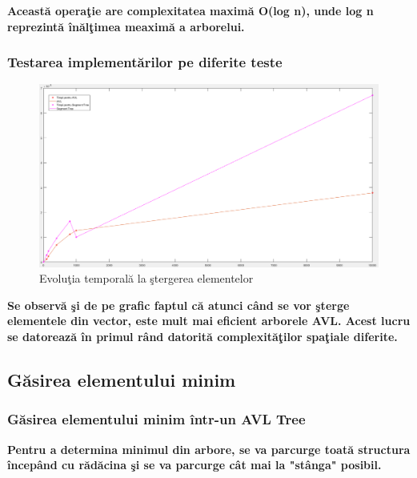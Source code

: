 \documentclass[12pt]{article}
\begin{document}
\textbf{\hspace{7mm} Aceast\u{a} opera\c{t}ie are complexitatea maxim\u{a} O(log n), unde log n reprezint\u{a} \^{i}n\u{a}l\c{t}imea meaxim\u{a} a arborelui.}
\subsubsection{Testarea implement\u{a}rilor pe diferite teste}

\begin{figure}[H]
\includegraphics[scale = 0.4]{Delete.png}
\caption{Evolu\c{t}ia temporal\u{a} la \c{s}tergerea elementelor}
\end{figure}
\textbf{\hspace{7mm}Se observ\u{a} \c{s}i de pe grafic faptul c\u{a} atunci c\^{a}nd se vor \c{s}terge elementele din vector, este mult mai eficient arborele AVL. Acest lucru se datoreaz\u{a} \^{i}n primul r\^{a}nd datorit\u{a} complexit\u{a}\c{t}ilor spa\c{t}iale diferite.}

\newpage
\subsection{G\u{a}sirea elementului minim}

\subsubsection{G\u{a}sirea elementului minim \^{i}ntr-un AVL Tree}

\textbf{\hspace{7mm} Pentru a determina minimul din arbore, se va parcurge toat\u{a} structura \^{i}ncep\^{a}nd cu r\u{a}d\u{a}cina \c{s}i se va parcurge c\^{a}t mai la "st\^{a}nga" posibil.}
\end{document}
